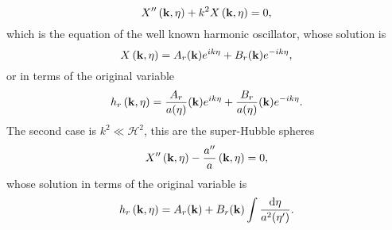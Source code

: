 \documentclass{article}
\begin{document}
\begin{equation}
    X''\left(\bold{k},\eta\right) + k^2X\left(\bold{k},\eta\right) = 0,
\end{equation}
which is the equation of the well known harmonic oscillator, whose solution is
\begin{equation}
    X\left(\bold{k},\eta\right) = A_r(\bold{k})e^{ik\eta} + B_r(\bold{k})e^{-ik\eta},
\end{equation}
or in terms of the original variable
\begin{equation}
    h_{r}\left(\bold{k},\eta\right) = \frac{A_r}{a(\eta)}(\bold{k})e^{ik\eta} + 
    \frac{B_r}{a(\eta)}(\bold{k})e^{-ik\eta}.
\end{equation}
The second case is $k^2 \ll \mathcal{H}^2$, this are the super-Hubble spheres
\begin{equation}
    X''\left(\bold{k},\eta\right) - \frac{a''}{a}\left(\bold{k},\eta\right) = 0,
\end{equation}
whose solution in terms of the original variable is
\begin{equation}
    h_{r}\left(\bold{k},\eta\right) = A_r(\bold{k}) + 
    B_r(\bold{k})\int \frac{\mathrm{d}\eta}{a^2(\eta')}.
\end{equation}
\end{document}
